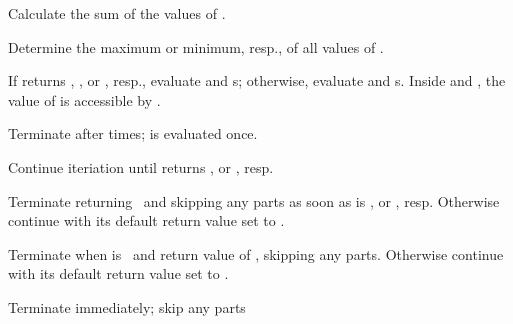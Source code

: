 \begin{LIST}{1cm}
\begin{LIST}{.5cm}
    {
    Calculate the sum of the values of .
    }

    {
    Determine the maximum or minimum, resp., of all values of
    . 
    }

    {
    If  returns \T, \T, or \NIL, resp., evaluate
     and s; otherwise, evaluate 
    and s. Inside  and , the value
    of  is accessible by . 
    }

    {
    Terminate  after  times;  is evaluated once.
    }

    {
    Continue iteriation until  returns \NIL, or \T, resp.
    }

    {
    Terminate  returning \NIL\ and skipping any  parts as soon as  is \NIL, or \T, resp. Otherwise continue  with its default return value set to \T.
    }

    {
    Terminate  when  is \T\ and return value of , skipping any  parts. Otherwise continue  with its default return value set to \T.
    }

    {
    Terminate  immediately; skip any  parts
    }
  \end{LIST}
\end{LIST}



